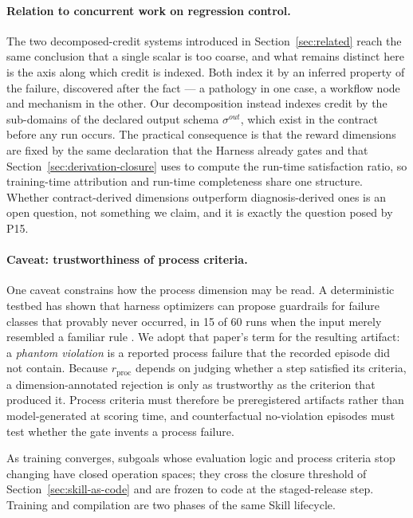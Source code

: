 \documentclass[11pt]{article}
\begin{document}
\paragraph{Relation to concurrent work on regression control.}
The two decomposed-credit systems introduced in Section~\ref{sec:related} \cite{luo2026gsme,lin2026wml} reach the same conclusion that a single scalar is too coarse, and what remains distinct here is the axis along which credit is indexed. Both index it by an inferred property of the failure, discovered after the fact --- a pathology in one case, a workflow node and mechanism in the other. Our decomposition instead indexes credit by the sub-domains of the declared output schema $\sigma^{out}$, which exist in the contract before any run occurs. The practical consequence is that the reward dimensions are fixed by the same declaration that the Harness already gates and that Section~\ref{sec:derivation-closure} uses to compute the run-time satisfaction ratio, so training-time attribution and run-time completeness share one structure. Whether contract-derived dimensions outperform diagnosis-derived ones is an open question, not something we claim, and it is exactly the question posed by P15.

\paragraph{Caveat: trustworthiness of process criteria.}
One caveat constrains how the process dimension may be read. A deterministic testbed has shown that harness optimizers can propose guardrails for failure classes that provably never occurred, in 15 of 60 runs when the input merely resembled a familiar rule \cite{wang2026phantom}. We adopt that paper's term for the resulting artifact: a \textit{phantom violation} is a reported process failure that the recorded episode did not contain. Because $r_{\mathrm{proc}}$ depends on judging whether a step satisfied its criteria, a dimension-annotated rejection is only as trustworthy as the criterion that produced it. Process criteria must therefore be preregistered artifacts rather than model-generated at scoring time, and counterfactual no-violation episodes must test whether the gate invents a process failure.

As training converges, subgoals whose evaluation logic and process criteria stop changing have closed operation spaces; they cross the closure threshold of Section~\ref{sec:skill-as-code} and are frozen to code at the staged-release step. Training and compilation are two phases of the same Skill lifecycle.
\end{document}
